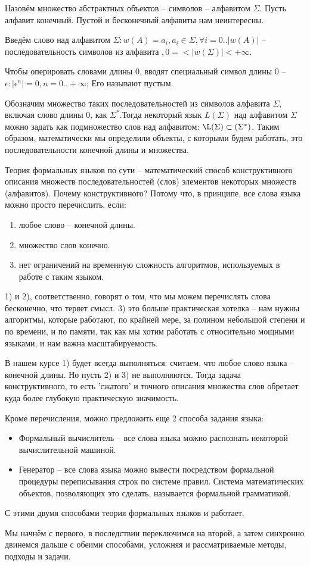  Назовём множество абстрактных объектов -- символов -- алфавитом $\Sigma$. Пусть алфавит конечный. Пустой и бесконечный алфавиты нам неинтересны.

Введём слово над алфавитом $\Sigma: w(A)={a_i, a_i \in \Sigma, \forall i=0..|w(A)|}$ -- последовательность символов из алфавита $, 0 =< |w(\Sigma)| <+\infty$.

Чтобы оперировать словами длины 0, вводят специальный символ длины 0 -- $\epsilon:|\epsilon^n|=0, n=0..+\infty$; Его называют пустым.

Обозначим множество таких последовательностей из символов алфавита $\Sigma$, включая слово длины 0, как $\Sigma^*$.Тогда некоторый язык $L(\Sigma)$ над алфавитом $\Sigma$ можно задать как подмножество слов над алфавитом: $\L(\Sigma)\subset(\Sigma^*)$. Таким образом, математически мы определили объекты, с которыми будем работать, это последовательности конечной длины и множества.

Теория формальных языков по сути -- математический способ конструктивного описания множеств последовательностей (слов) элементов некоторых множеств (алфавитов). Почему конструктивного? Потому что, в принципе, все слова языка можно просто перечислить, если:
\begin{enumerate}
\item любое слово -- конечной длины.
\item множество слов конечно.
\item нет ограничений на временную сложность алгоритмов, используемых в работе с таким языком.
\end{enumerate}
1) и 2), соответственно, говорят о том, что мы можем перечислять слова бесконечно, что теряет смысл. 3) это больше практическая хотелка -- нам нужны алгоритмы, которые работают, по крайней мере, за полином небольшой степени и по времени, и по памяти, так как мы хотим работать с относительно мощными языками, и нам важна масштабируемость.

В нашем курсе 1) будет всегда выполняться: считаем, что любое слово языка -- конечной длины. Но пусть 2) и 3) не выполняются. Тогда задача конструктивного, то есть 'сжатого' и точного описания множества слов обретает куда более глубокую практическую значимость.

Кроме перечисления, можно предложить еще 2 способа задания языка:
\begin{itemize}
\item Формальный вычислитель -- все слова языка можно распознать некоторой вычислительной машиной.
\item Генератор -- все слова языка можно вывести посредством формальной процедуры переписывания строк по системе правил. Система математических объектов, позволяющих это сделать, называется формальной грамматикой.
\end{itemize}
С этими двумя способами теория формальных языков и работает.

Мы начнём с первого, в последствии переключимся на второй, а затем синхронно двинемся дальше с обеими способами, усложняя и рассматриваемые методы, подходы и задачи.
